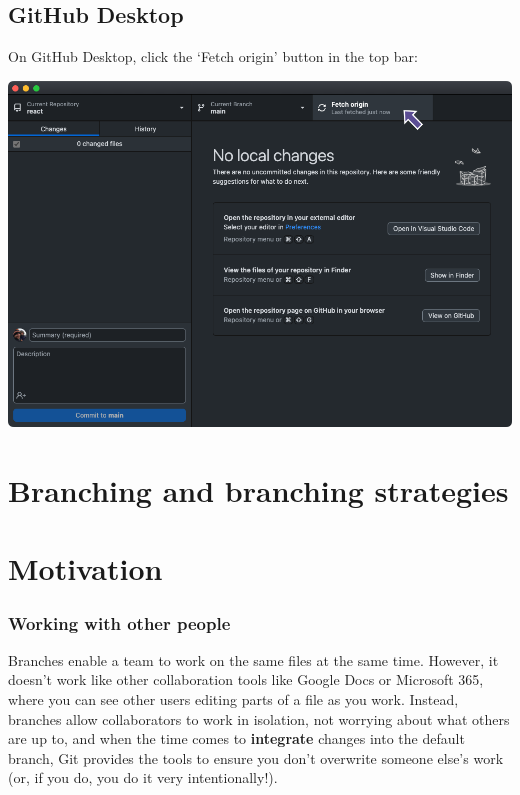 \documentclass[
  letterpaper,
  DIV=11,
  numbers=noendperiod]{scrartcl}
\begin{document}
\subsection{GitHub Desktop}

On GitHub Desktop, click the `Fetch origin' button in the top bar:

\includegraphics{images/image26.png}

\hypertarget{branching-and-branching-strategies}{%
\section{Branching and branching
strategies}\label{branching-and-branching-strategies}}

\hypertarget{motivation}{%
\section{Motivation}\label{motivation}}

\hypertarget{working-with-other-people}{%
\subsubsection{Working with other
people}\label{working-with-other-people}}

Branches enable a team to work on the same files at the same time.
However, it doesn't work like other collaboration tools like Google Docs
or Microsoft 365, where you can see other users editing parts of a file
as you work. Instead, branches allow collaborators to work in isolation,
not worrying about what others are up to, and when the time comes to
\textbf{integrate} changes into the default branch, Git provides the
tools to ensure you don't overwrite someone else's work (or, if you do,
you do it very intentionally!).
\end{document}
